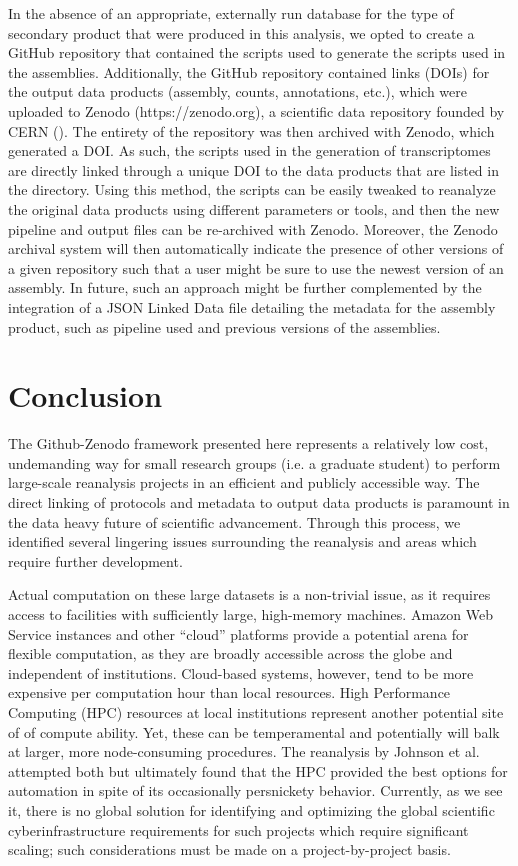\documentclass[12pt]{article}
\begin{document}
In the absence of an appropriate, externally run database for the type of secondary product that were produced in this analysis, we opted to create a GitHub repository that contained the scripts used to generate the scripts used in the assemblies. Additionally, the GitHub repository contained links (DOIs) for the output data products (assembly, counts, annotations, etc.), which were uploaded to Zenodo (https://zenodo.org), a scientific data repository founded by CERN (). The entirety of the repository was then archived with Zenodo, which generated a DOI. As such, the scripts used in the generation of transcriptomes are directly linked through a unique DOI to the data products that are listed in the directory. Using this method, the scripts can be easily tweaked to reanalyze the original data products using different parameters or tools, and then the new pipeline and output files can be re-archived with Zenodo. Moreover, the Zenodo archival system will then automatically indicate the presence of other versions of a given repository such that a user might be sure to use the newest version of an assembly. In future, such an approach might be further complemented by the integration of a JSON Linked Data file detailing the metadata for the assembly product, such as pipeline used and previous versions of the assemblies.

\section{Conclusion}

The Github-Zenodo framework presented here represents a relatively low cost, undemanding way for small research groups (i.e. a graduate student) to perform large-scale reanalysis projects in an efficient and publicly accessible way. The direct linking of protocols and metadata to output data products is paramount in the data heavy future of scientific advancement. Through this process, we identified several lingering issues surrounding the reanalysis and areas which require further development.

Actual computation on these large datasets is a non-trivial issue, as it requires access to facilities with sufficiently large, high-memory machines. Amazon Web Service instances and other ``cloud'' platforms provide a potential arena for flexible computation, as they are broadly accessible across the globe and independent of institutions. Cloud-based systems, however, tend to be more expensive per computation hour than local resources. High Performance Computing (HPC) resources at local institutions represent another potential site of of compute ability. Yet, these can be temperamental and potentially will balk at larger, more node-consuming procedures. The reanalysis by Johnson et al. \cite{Johnson2018} attempted both but ultimately found that the HPC provided the best options for automation in spite of its occasionally persnickety behavior. Currently, as we see it, there is no global solution for identifying and optimizing the global scientific cyberinfrastructure requirements for such projects which require significant scaling; such considerations must be made on a project-by-project basis.
\end{document}
